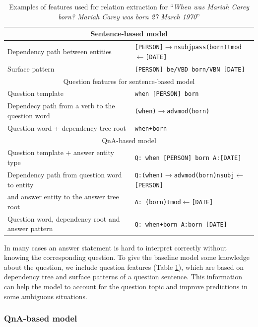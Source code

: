 \begin{table}[tbh]
\centering
\begin{tabular}{|p{9cm}|p{7.8cm}|}
\hline
\multicolumn{2}{|c|}{Sentence-based model}\\
\hline
Dependency path between entities & \texttt{[PERSON]$\rightarrow$nsubjpass(born)tmod$\leftarrow$[DATE]}\\
Surface pattern & \texttt{[PERSON] be/VBD born/VBN [DATE]}\\
\hline
\hline
\multicolumn{2}{|c|}{Question features for sentence-based model}\\
\hline
Question template & \texttt{when [PERSON] born}\\
Dependecy path from a verb to the question word & \texttt{(when)$\rightarrow$advmod(born)}\\
Question word + dependency tree root & \texttt{when+born}\\
\hline
\hline
\multicolumn{2}{|c|}{QnA-based model}\\
\hline
Question template + answer entity type & \texttt{Q: when [PERSON] born A:[DATE]}\\
Dependency path from question word to entity & \texttt{Q:(when)$\rightarrow$advmod(born)nsubj$\leftarrow$[PERSON]}\\
and answer entity to the answer tree root & \texttt{A: (born)tmod$\leftarrow$[DATE]}\\
Question word, dependency root and answer pattern & \texttt{Q: when+born A:born [DATE]}\\
\hline
\end{tabular}
\caption{Examples of features used for relation extraction for ``\emph{When was Mariah Carey born? Mariah Carey was born 27 March 1970}''}
\label{table:qna_relextract:features}
\end{table}

In many cases an answer statement is hard to interpret correctly without knowing the corresponding question.
To give the baseline model some knowledge about the question, we include question features (Table \ref{table:qna_relextract:features}), which are based on dependency tree and surface patterns of a question sentence. 
This information can help the model to account for the question topic and improve predictions in some ambiguous situations.

\subsubsection{QnA-based model}
\label{section:factoid:approaches:cqarelextract:qnamodel}

